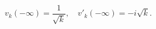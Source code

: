 \begin{equation}\label{eq:conventional}
v_k(-\infty)= \frac{1}{\sqrt{k}},\quad
v'_k(-\infty)=-i \sqrt{k}.
\end{equation}

